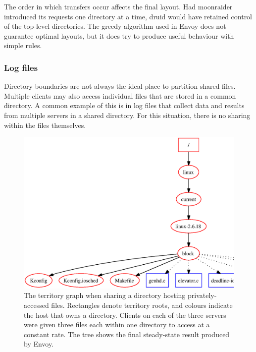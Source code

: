 The order in which transfers occur affects the final layout. Had moonraider introduced its requests one directory at a time, druid would have retained control of the top-level directories. The greedy algorithm used in Envoy does not guarantee optimal layouts, but it does try to produce useful behaviour with simple rules.

\subsubsection{Log files}

Directory boundaries are not always the ideal place to partition shared files. Multiple clients may also access individual files that are stored in a common directory. A common example of this is in log files that collect data and results from multiple servers in a shared directory. For this situation, there is no sharing within the files themselves.

\begin{figure}[t]
\centering
\includegraphics[width=\figwidth]{figures/territory-logs}
\caption[Territory graph for log files in a shared directory]{The territory graph when sharing a directory hosting privately-accessed files. Rectangles denote territory roots, and colours indicate the host that owns a directory. Clients on each of the three servers were given three files each within one directory to access at a constant rate. The tree shows the final steady-state result produced by Envoy.}
\label{fig:territory-logs}
\end{figure}

